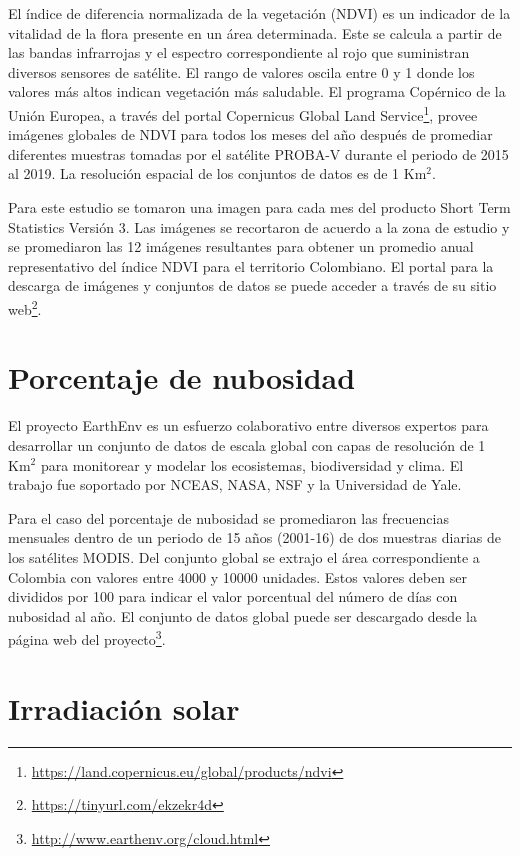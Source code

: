 El índice de diferencia normalizada de la vegetación (NDVI) es un indicador de la vitalidad de la flora presente en un área determinada.  Este se calcula a 
partir de las bandas infrarrojas y el espectro correspondiente al rojo que suministran diversos sensores de satélite.  El rango de valores oscila entre 0 y 1 
donde los valores más altos indican vegetación más saludable.  El programa Copérnico de la Unión Europea, a través del portal Copernicus Global Land 
Service\footnote{\url{https://land.copernicus.eu/global/products/ndvi}}, provee imágenes globales de NDVI para todos los meses del año después de promediar 
diferentes muestras tomadas por el satélite PROBA-V durante el periodo de 2015 al 2019.  La resolución espacial de los conjuntos de datos es de 1 Km$^2$. 

Para este estudio se tomaron una imagen para cada mes del producto Short Term Statistics Versión 3.  Las imágenes se recortaron de acuerdo a la zona de estudio 
 y se promediaron las 12 imágenes resultantes para obtener un promedio anual representativo del índice NDVI para el territorio Colombiano.  El portal para la 
descarga de imágenes y conjuntos de datos se puede acceder a través de su sitio web\footnote{\url{ https://tinyurl.com/ekzekr4d}}.

\section{Porcentaje de nubosidad}

El proyecto EarthEnv \cite{wilson_remotely_2016}  es un esfuerzo colaborativo entre diversos expertos para desarrollar un conjunto de datos de escala global con 
capas de resolución de 1 Km$^2$ para monitorear y modelar los ecosistemas, biodiversidad y clima.  El trabajo fue soportado por NCEAS, NASA, NSF y la 
Universidad de Yale.  

Para el caso del porcentaje de nubosidad se promediaron las frecuencias mensuales dentro de un periodo de 15 años (2001-16) de dos muestras diarias de los 
satélites MODIS.  Del conjunto global se extrajo el área correspondiente a Colombia con valores entre 4000 y 10000 unidades.  Estos valores deben ser divididos 
por 100 para indicar el valor porcentual del número de días con nubosidad al año.  El conjunto de datos global puede ser descargado desde la página web del 
proyecto\footnote{\url{http://www.earthenv.org/cloud.html}}.

\section{Irradiación solar}

